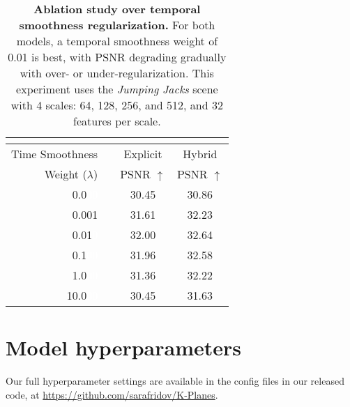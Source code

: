\documentclass[10pt,twocolumn,letterpaper]{article}
\begin{document}
\renewcommand{\tabcolsep}{6pt}
\begin{table}[ht]
  \centering
  \begin{tabular}{rlcc}
    \multicolumn{4}{c}{} \\
    \toprule
     Time Smoothness & & Explicit   & Hybrid    \\ 
     Weight ($\lambda$) && PSNR $\uparrow$ & PSNR $\uparrow$ \\
    \cmidrule(){1-1} \cmidrule(){3-4} 
0.0\textcolor{white}{00} && 30.45 &
30.86 \\
    0.001 && 31.61 &
32.23 \\
    0.01\textcolor{white}{0} && 32.00 &
32.64 \\ 
    0.1\textcolor{white}{00} && 31.96 &
32.58 \\
    1.0\textcolor{white}{00} && 31.36 &
32.22 \\
    10.0\textcolor{white}{00} && 30.45 &
31.63 \\
\bottomrule
  \end{tabular}
  \caption{\textbf{Ablation study over temporal smoothness regularization.} For both models, a temporal smoothness weight of 0.01 is best, with PSNR degrading gradually with over- or under-regularization. This experiment uses the \emph{Jumping Jacks} scene with 4 scales: 64, 128, 256, and 512, and 32 features per scale.}
  \label{tab:smoothness}
\end{table}


\section{Model hyperparameters}

Our full hyperparameter settings are available in the config files in our released code, at \url{https://github.com/sarafridov/K-Planes}.
\end{document}
